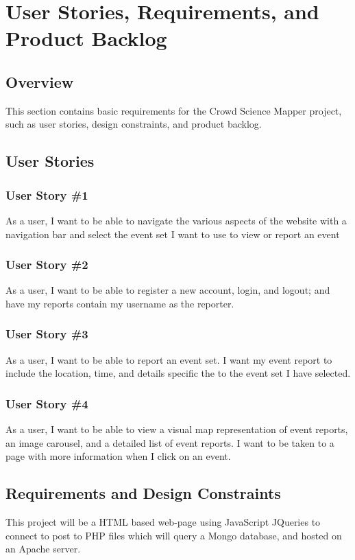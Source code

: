 
\chapter{User Stories,  Requirements, and Product Backlog}
\section{Overview}

This section contains basic requirements for the Crowd Science Mapper project, such as user stories, design constraints, and product backlog. 

\section{User Stories}

\subsection{User Story \#1} 
As a user, I want to be able to navigate the various aspects of the website with a navigation bar and select the event set I want to use to view or report an event

\subsection{User Story \#2}
 As a user, I want to be able to register a new account, login, and logout; and have my reports contain my username as the reporter.

\subsection{User Story \#3} 
As a user, I want to be able to report an event set. I want my event report to include the location, time, and details specific the to the event set I have selected.

\subsection{User Story \#4} 
As a user, I want to be able to view a visual map representation of event reports, an image carousel, and a detailed list of event reports. I want to be taken to a page with more information when I click on an event.

\section{Requirements and Design Constraints}
This project will be a HTML based web-page using JavaScript JQueries to connect to post to PHP files which will query a Mongo database, and hosted on an Apache server.

